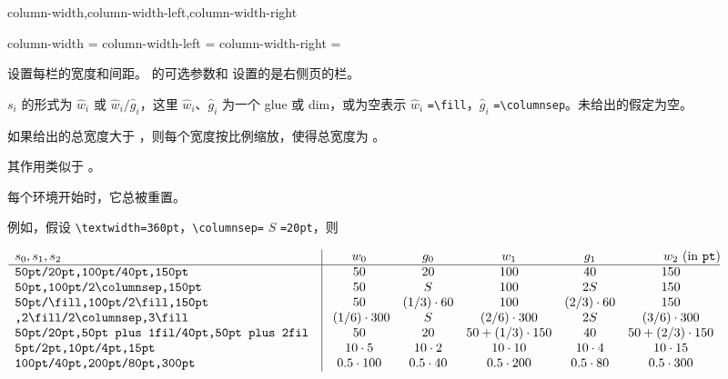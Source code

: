 \documentclass{cusdoc}
\begin{document}
\begin{keyval}[path=paracol]{column-width,column-width-left,column-width-right}
  \begin{syntax}
    column-width       =  
    column-width-left  = 
    column-width-right = 
  \end{syntax}
设置每栏的宽度和间距。 的可选参数和  设置的是右侧页的栏。

$s_i$ 的形式为 $\hat{w}_i$ 或 $\hat{w}_i \texttt{/} \hat{g}_i$，这里 $\hat{w}_i$、$\hat{g}_i$ 为一个 glue 或 dim，或为空表示 $\hat{w}_i$ \verb|=\fill|，$\hat{g}_i$ \verb|=\columnsep|。未给出的假定为空。

如果给出的总宽度大于 ，则每个宽度按比例缩放，使得总宽度为 。

其作用类似于 。

每个环境开始时，它总被重置。
\end{keyval}

例如，假设 \verb|\textwidth=360pt|，\verb|\columnsep=| $S$ \verb|=20pt|，则

\begin{pagecenterbox}
\def\|{\verb|}\small{}
$\begin{array}[b]{l|ccccc}
s_0,s_1,s_2&w_0&g_0&w_1&g_1&w_2\rlap{ (in \texttt{pt})}\\\hline
\|50pt/20pt,100pt/40pt,150pt|&50&20&100&40&150\\
\|50pt,100pt/2\columnsep,150pt|&50&S&
                               100&2S&150\\
\|50pt/\fill,100pt/2\fill,150pt|&50&(1/3)\cdot60&100&(2/3)\cdot60&150\\
\|,2\fill/2\columnsep,3\fill|&\ (1/6)\cdot300&S&
                             (2/6)\cdot300&2S&
                             (3/6)\cdot300\\
\|50pt/20pt,50pt plus 1fil/40pt,50pt plus 2fil |&
                             50&20&50+(1/3)\cdot150&40&
                             50+(2/3)\cdot150\\
\|5pt/2pt,10pt/4pt,15pt|&10\cdot5&10\cdot2&10\cdot10&10\cdot4&
                        10\cdot15\\
\|100pt/40pt,200pt/80pt,300pt|&0.5\cdot100&0.5\cdot40&
                              0.5\cdot200&0.5\cdot80&
                              0.5\cdot300
\end{array}$
\end{pagecenterbox}
\end{document}
